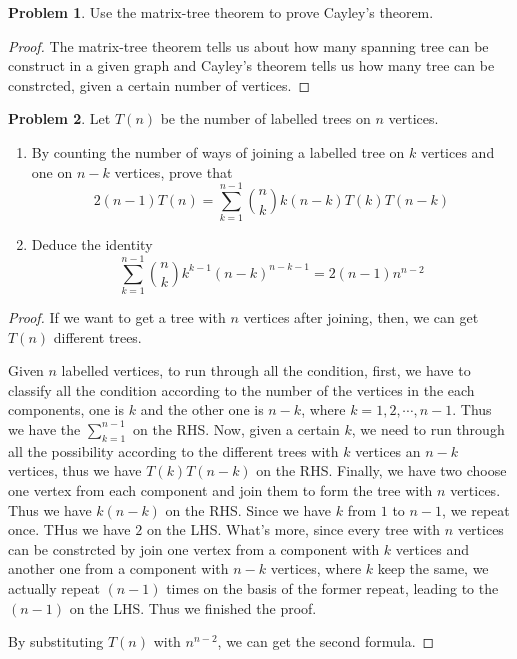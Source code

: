 \documentclass[a4paper,11pt]{article}%
\theoremstyle{remark}
\theoremstyle{definition}
\newtheorem{problem}{Problem}[subsection]
\begin{document}
\begin{problem}
    Use the matrix-tree theorem to prove Cayley's theorem.
    \begin{proof}
       The matrix-tree theorem tells us about how many spanning tree can be construct in a given graph and 
       Cayley's theorem tells us how many tree can be constrcted, given a certain number of vertices. 
    \end{proof}
\end{problem}
\begin{problem}
    Let $T(n)$ be the number of labelled trees on $n$ vertices.
    \begin{enumerate}
        \item By counting the number of ways of joining a labelled tree on $k$ vertices and one on $n-k$ vertices, prove that 
        \[2(n-1)T(n)=\sum_{k=1}^{n-1}\binom{n}{k} k(n-k)T(k)T(n-k)\]
        \item Deduce the identity 
        \[\sum_{k=1}^{n-1}\binom{n}{k}k^{k-1}(n-k)^{n-k-1}=2(n-1)n^{n-2}\]
    \end{enumerate}
    \begin{proof}
        If we want to get a tree with $n$ vertices after joining, then, we can get $T(n)$ different trees.

        Given $n$ labelled vertices, to run through all the condition, first, we have to classify all the condition 
        according to the number of the vertices in the each components, one is $k$ and the other one is $n-k$, where $k=1,2,\cdots,n-1$.
        Thus we have the $\sum_{k=1}^{n-1}$ on the RHS. Now, given a certain $k$, we need to run through all the possibility according to 
        the different trees with $k$ vertices an $n-k$ vertices, thus we have $T(k)T(n-k)$ on the RHS. Finally, we 
        have two choose one vertex from each component and join them to form the tree with $n$ vertices. Thus we have $k(n-k)$ on the RHS.
        Since we have $k$ from $1$ to $n-1$, we repeat once. THus we have $2$ on the LHS. What's more, since every tree with $n$ vertices 
        can be constrcted by join one vertex from a component with $k$ vertices and another one from a component with $n-k$ vertices,
        where $k$ keep the same, we actually repeat $(n-1)$ times on the basis of the former repeat, leading to the $(n-1)$ on the LHS. 
        Thus we finished the proof.

       By substituting $T(n)$ with $n^{n-2}$,  we can get the second formula. 
    \end{proof}
\end{problem}
\end{document}
